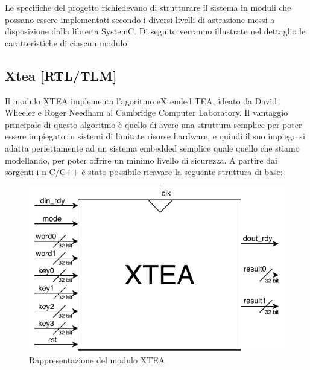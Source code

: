 \documentclass[]{IEEEtran}
\begin{document}
Le specifiche del progetto richiedevano di strutturare il sistema in moduli che possano essere implementati secondo i 
diversi livelli di astrazione messi a disposizione dalla libreria SystemC. Di seguito verranno illustrate nel dettaglio 
le caratteristiche di ciascun modulo:

\subsection{Xtea [RTL/TLM]}\label{sec:xtea}
Il modulo XTEA implementa l'agoritmo eXtended TEA, ideato da David Wheeler e Roger Needham al Cambridge Computer 
Laboratory. Il vantaggio principale di questo algoritmo \`e quello di avere una struttura semplice per poter essere 
impiegato in sistemi di limitate risorse hardware, e quindi il suo impiego si adatta perfettamente ad un sistema embedded
semplice quale quello che stiamo modellando, per poter offrire un minimo livello di sicurezza. A partire dai sorgenti i
n C/C++ \`e stato possibile ricavare la seguente struttura di base: 
\begin{figure}[h]
    \centering
    \includegraphics[width=0.7\columnwidth]{figures/xtea.pdf}
	\caption{Rappresentazione del modulo XTEA}
    \label{fig:xtea}
\end{figure}
\end{document}
